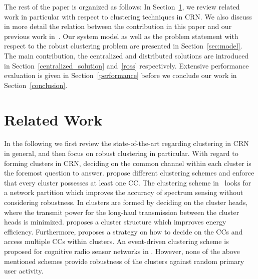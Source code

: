 \documentclass[times]{ettauth}
\theoremstyle{mytheoremstyle}
\theoremstyle{mytheoremstyle}
\theoremstyle{mytheoremstyle}
\begin{document}
The rest of the paper is organized as follows:
In Section~\ref{related_work}, we review related work in particular with respect to clustering techniques in CRN.
We also discuss in more detail the relation between the contribution in this paper and our previous work in~\cite{Li11_ROSS}.
Our system model as well as the problem statement with respect to the robust clustering problem are presented in Section~\ref{sec:model}. 
The main contribution, the centralized and distributed solutions are introduced in Section~\ref{centralized_solution} and~\ref{ross} respectively.
Extensive performance evaluation is given in Section~\ref{performance} before we conclude our work in Section~\ref{conclusion}.

\section{Related Work}
\label{related_work}
In the following we first review the state-of-the-art regarding clustering in CRN in general, and then focus on robust clustering in particular.
With regard to forming clusters in CRN, deciding on the common channel within each cluster is the foremost question to answer.
\cite{Zhao07, Chen07,Affinity_clustering_09icccn} propose different clustering schemes and enforce that every cluster possesses at least one CC.
The clustering scheme in~\cite{Consensus_based_clustering12} looks for a network partition which improves the accuracy of spectrum sensing without considering robustness.
In \cite{TWC2012_cooperative_communication} clusters are formed by deciding on the cluster heads, where the transmit power for the long-haul transmission between the cluster heads is minimized.
\cite{clustering_globecom11} proposes a cluster structure which imprroves energy efficiency.
Furthermore, \cite{cluster_EW10} proposes a strategy on how to decide on the CCs and access multiple CCs within clusters.
An event-driven clustering scheme is proposed for cognitive radio sensor networks in \cite{Ozger_cluster_crsn_13}.
However, none of the above mentioned schemes provide robustness of the clusters against random primary user activity.
\end{document}
